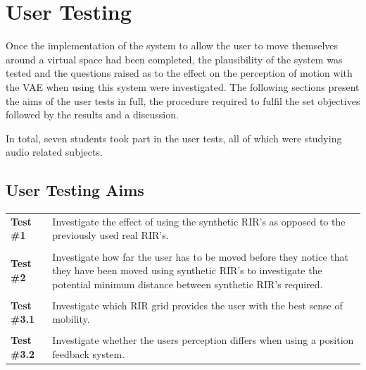 \documentclass[../../main.tex]{subfiles}
\begin{document}
\section{User Testing}
	Once the implementation of the system to allow the user to move themselves around a virtual space had been completed, the plausibility of the system was tested and the questions raised as to the effect on the perception of motion with the \ac{VAE} when using this system were investigated. The following sections present the aims of the user tests in full, the procedure required to fulfil the set objectives followed by the results and a discussion.

	In total, seven students took part in the user tests, all of which were studying audio related subjects.

	\subsection{User Testing Aims}





		\begin{tabular}{l| p{}}
		
			\textbf{Test \#1} & Investigate the effect of using the synthetic \ac{RIR}'s as opposed to the previously used real \ac{RIR}'s.\\
			&\\
			\textbf{Test \#2} & Investigate how far the user has to be moved before they notice that they have been moved using synthetic \ac{RIR}'s to investigate the potential minimum distance between synthetic \ac{RIR}'s required.\\
			&\\
			\textbf{Test \#3.1} & Investigate which \ac{RIR} grid provides the user with the best sense of mobility.\\
			&\\
			\textbf{Test \#3.2} &  Investigate whether the users perception differs when using a position feedback system.
			\end{tabular}
\end{document}
